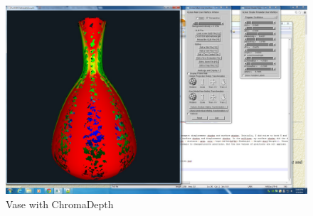 \documentclass[12pt,letterpaper]{article}
\begin{document}
\begin{figure}[p]
    \centering
    \includegraphics[width=1.0\textwidth]{vaseandinterface.jpg}
    \caption{Vase with ChromaDepth}
\end{figure}
\end{document}
